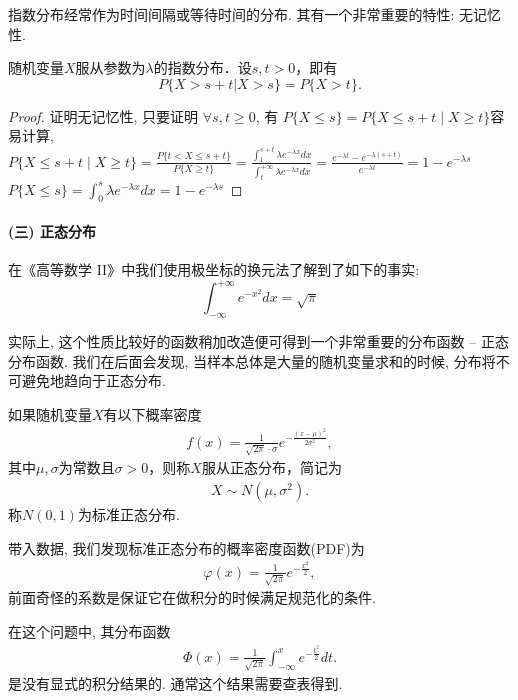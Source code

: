 指数分布经常作为时间间隔或等待时间的分布. 其有一个非常重要的特性: 无记忆性.

\begin{proposition}[指数分布的无记忆性]
    随机变量$X$服从参数为$\lambda$的指数分布．设$s,t>0$，即有
    \[ P\{X>s+t|X>s\}=P\{X>t\}.\]
\end{proposition}

\begin{proof}
    证明无记忆性, 只要证明 $\forall s, t \geq 0$, 有 $P\{X \leq s\}=P\{X \leq s+t \mid X \geq t\}$容易计算, $P\{X \leq s+t \mid X \geq t\}=\frac{P\{t<X \leq s+t\}}{P\{X \geq t\}}=\frac{\int_1^{s+t} \lambda e^{-\lambda x} d x}{\int_t^{+\infty} \lambda e^{-\lambda x} d x}=\frac{e^{-\lambda t}-e^{-\lambda(s+t)}}{e^{-\lambda t}}=1-e^{-\lambda s}$ $P\{X \leq s\}=\int_0^s \lambda e^{-\lambda x} d x=1-e^{-\lambda s}$
\end{proof}

\paragraph{(三) 正态分布}

在《高等数学 II》中我们使用极坐标的换元法了解到了如下的事实:
$$
    \int_{-\infty}^{+\infty}e^{-x^2} dx =\sqrt \pi
$$

实际上, 这个性质比较好的函数稍加改造便可得到一个非常重要的分布函数 --
正态分布函数. 我们在后面会发现, 当样本总体是大量的随机变量求和的时候,
分布将不可避免地趋向于正态分布.

\begin{definition}
    如果随机变量$X$有以下概率密度
    \begin{align*}
        f(x)=\frac1{\sqrt{2\pi}\cdot\sigma}e^{-\frac{(x-\mu)^2}{2\sigma^2}},
    \end{align*}
    其中$\mu,\sigma$为常数且$\sigma>0$，则称$X$服从正态分布，简记为%
    \begin{align*}
        X \sim N(\mu,\sigma^2).
    \end{align*}
    称$N(0,1)$为标准正态分布.
\end{definition}

带入数据, 我们发现标准正态分布的概率密度函数(PDF)为
\begin{align*}
    \varphi(x)=\frac1{\sqrt{2\pi}}e^{-\frac{x^2}{2}},
\end{align*}
前面奇怪的系数是保证它在做积分的时候满足规范化的条件.

在这个问题中, 其分布函数
\begin{align*}
    \Phi(x)=\frac1{\sqrt{2\pi}}\int_{-\infty}^xe^{-\frac{t^2}{2}}dt.
\end{align*}
是没有显式的积分结果的. 通常这个结果需要查表得到.

